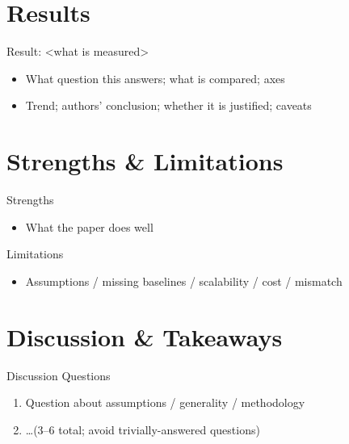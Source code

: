 \documentclass[aspectratio=169]{beamer}
\begin{document}
\section{Results}
\begin{frame}{Result: <what is measured>}
  \begin{itemize}
    \item What question this answers; what is compared; axes
    \item Trend; authors' conclusion; whether it is justified; caveats
  \end{itemize}
\end{frame}

\section{Strengths \& Limitations}
\begin{frame}{Strengths}
  \begin{itemize}
    \item What the paper does well
  \end{itemize}
\end{frame}

\begin{frame}{Limitations}
  \begin{itemize}
    \item Assumptions / missing baselines / scalability / cost / mismatch
  \end{itemize}
\end{frame}

\section{Discussion \& Takeaways}
\begin{frame}{Discussion Questions}
  \begin{enumerate}
    \item Question about assumptions / generality / methodology
    \item \dots (3--6 total; avoid trivially-answered questions)
  \end{enumerate}
\end{frame}
\end{document}

